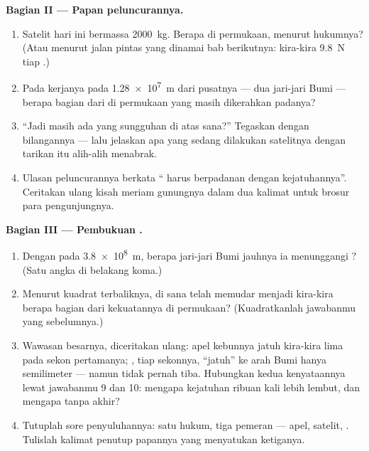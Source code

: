 \begin{problem}
\medskip\noindent\textbf{Bagian II --- Papan peluncurannya.}
\begin{enumerate}[resume]
  \item Satelit hari ini bermassa \qty{2000}{kg}. Berapa  di
        permukaan, menurut hukumnya? (Atau menurut jalan pintas yang
        dinamai bab berikutnya: kira-kira \qty{9.8}{N} tiap
        .)
  \item Pada  kerjanya pada \qty{1.28e7}{m} dari pusatnya ---
        dua jari-jari Bumi --- berapa bagian dari  di
        permukaan yang masih dikerahkan  padanya?
  \item ``Jadi masih ada  yang sungguhan di atas sana?''
        Tegaskan dengan bilangannya --- lalu jelaskan apa yang sedang
        dilakukan satelitnya dengan tarikan itu alih-alih menabrak.
  \item Ulasan peluncurannya berkata ``  harus
        berpadanan dengan kejatuhannya''. Ceritakan ulang kisah
        meriam gunungnya dalam dua kalimat untuk brosur para
        pengunjungnya.
\end{enumerate}

\medskip\noindent\textbf{Bagian III --- Pembukuan .}
\begin{enumerate}[resume]
  \item Dengan  pada \qty{3.8e8}{m}, berapa jari-jari Bumi
        jauhnya ia menunggangi ? (Satu angka di belakang
        koma.)
  \item Menurut kuadrat terbaliknya,  di sana telah memudar
        menjadi kira-kira berapa bagian dari kekuatannya di
        permukaan? (Kuadratkanlah jawabanmu yang sebelumnya.)
  \item Wawasan besarnya, diceritakan ulang: apel kebunnya jatuh
        kira-kira lima  pada sekon pertamanya; , tiap
        sekonnya, ``jatuh'' ke arah Bumi hanya semilimeter --- namun
        tidak pernah tiba. Hubungkan kedua kenyataannya lewat
        jawabanmu 9 dan 10: mengapa kejatuhan  ribuan kali lebih
        lembut, dan mengapa tanpa akhir?
  \item Tutuplah sore penyuluhannya: satu hukum, tiga pemeran ---
        apel, satelit, . Tulislah kalimat penutup papannya yang
        menyatukan ketiganya.
\end{enumerate}
\end{problem}
